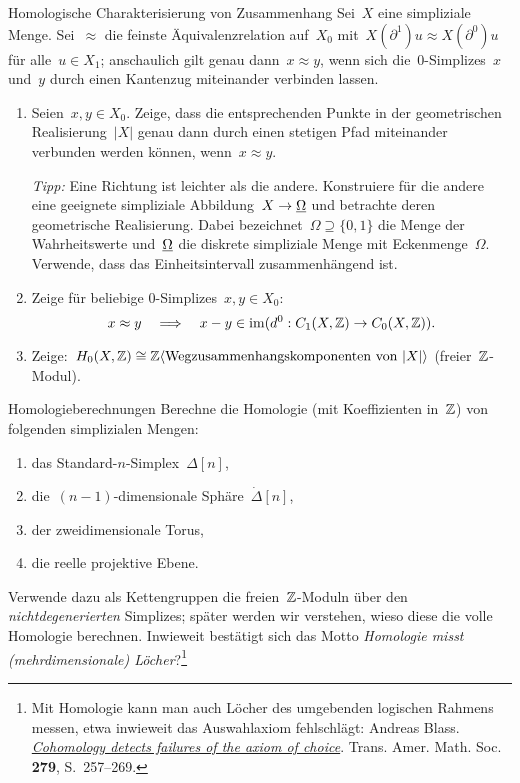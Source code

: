 \documentclass{uebblatt}
\begin{document}

\begin{aufgabe}{Homologische Charakterisierung von Zusammenhang}
Sei~$X$ eine simpliziale Menge. Sei~$\approx$ die feinste Äquivalenzrelation
auf~$X_0$ mit~$X(\partial^1)u \approx X(\partial^0)u$ für alle~$u \in X_1$;
anschaulich gilt genau dann~$x \approx y$, wenn sich die~0-Simplizes~$x$
und~$y$ durch einen Kantenzug miteinander verbinden lassen.
\begin{enumerate}
\item Seien~$x,y \in X_0$. Zeige, dass die entsprechenden Punkte in der
geometrischen Realisierung~$|X|$ genau dann durch einen stetigen Pfad
miteinander verbunden werden können, wenn~$x \approx y$.

\emph{Tipp:} Eine Richtung ist leichter als die andere. Konstruiere für die
andere eine geeignete simpliziale Abbildung~$X \to \underline{\Omega}$ und betrachte
deren geometrische Realisierung. Dabei bezeichnet~$\Omega \supseteq \{0,1\}$ die
Menge der Wahrheitswerte und~$\underline{\Omega}$ die diskrete simpliziale Menge mit
Eckenmenge~$\Omega$. Verwende, dass das Einheitsintervall zusammenhängend ist.

\item Zeige für beliebige 0-Simplizes~$x,y \in X_0$:
\[ x \approx y
  \quad\Longrightarrow\quad
  x - y \in \operatorname{im}(d^0 : C_1(X,\mathbb{Z}) \to C_0(X,\mathbb{Z})). \]

\item Zeige:~$H_0(X,\mathbb{Z}) \cong \mathbb{Z}\langle \text{Wegzusammenhangskomponenten
von~$|X|$} \rangle$ (freier~$\mathbb{Z}$-Modul).
\end{enumerate}
\end{aufgabe}

\begin{aufgabe}{Homologieberechnungen}
Berechne die Homologie (mit Koeffizienten in~$\mathbb{Z}$) von folgenden simplizialen
Mengen:
\begin{enumerate}
\item das Standard-$n$-Simplex~$\Delta[n]$,
\item die~$(n-1)$-dimensionale Sphäre~$\dot\Delta[n]$,
\item der zweidimensionale Torus,
\item die reelle projektive Ebene.
\end{enumerate}
Verwende dazu als Kettengruppen die freien~$\mathbb{Z}$-Moduln über den
\emph{nichtdegenerierten} Simplizes; später werden wir verstehen, wieso diese
die volle Homologie berechnen. Inwieweit bestätigt sich das Motto \emph{Homologie misst
(mehrdimensionale) Löcher}?\footnote{Mit Homologie kann man auch Löcher des
umgebenden logischen Rahmens messen, etwa inwieweit das Auswahlaxiom
fehlschlägt: Andreas Blass.
\emph{\href{http://www.ams.org/journals/tran/1983-279-01/S0002-9947-1983-0704615-7/S0002-9947-1983-0704615-7.pdf}{Cohomology detects failures of the axiom of
choice}}. Trans. Amer. Math. Soc. \textbf{279}, S.~257--269.}
\end{aufgabe}
\end{document}
